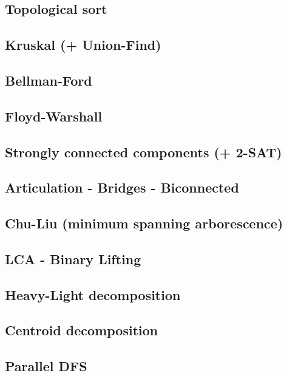 \subsection{Topological sort}
\subsection{Kruskal (+ Union-Find)}
\subsection{Bellman-Ford}
\subsection{Floyd-Warshall}
\subsection{Strongly connected components (+ 2-SAT)}
\subsection{Articulation - Bridges - Biconnected}
\subsection{Chu-Liu (minimum spanning arborescence)}
\subsection{LCA - Binary Lifting}
\subsection{Heavy-Light decomposition}
\subsection{Centroid decomposition}
\subsection{Parallel DFS}
